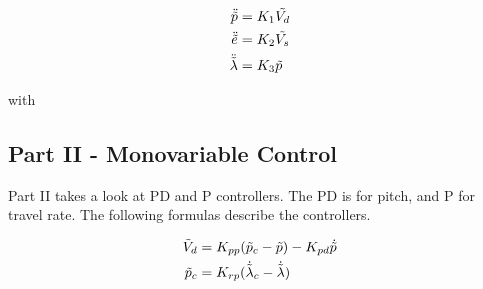 \begin{subequations}\label{eq:P1_lin_eq_of_motion}
    \begin{align}
        \ddot{\tilde{p}}&=K_1\tilde{V_d}     \label{eq:P1_lin_eq_of_motion_p} \\
        \ddot{\tilde{e}}&=K_2\tilde{V_s}     \label{eq:P1_lin_eq_of_motion_e} \\
        \ddot{\tilde{\lambda}}&=K_3\tilde{p} \label{eq:P1_lin_eq_of_motion_l}
    \end{align}
\end{subequations}

with


\subsection{Part II - Monovariable Control}\label{subsec:part2}
Part II takes a look at PD and P controllers. The PD is for pitch, and P for travel rate. The following formulas describe the controllers.

\begin{align}
        \tilde{V}_d &= K_{pp} (\tilde{p}_c - \tilde{p}) - K_{pd}\dot{\tilde{p}}  \label{eq:P2_PD}\\  
        \tilde{p}_c &= K_{rp} (\dot{\tilde{\lambda}}_c - \dot{\tilde{\lambda}}) \label{eq:P2_P}
\end{align}

